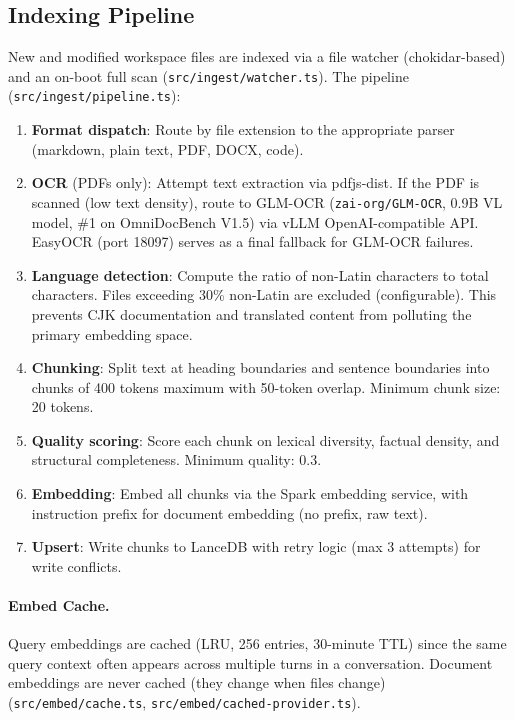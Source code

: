 \documentclass[11pt]{article}
\begin{document}
\subsection{Indexing Pipeline}
\label{sec:arch:ingest}

New and modified workspace files are indexed via a file watcher (chokidar-based) and an
on-boot full scan (\texttt{src/ingest/watcher.ts}). The pipeline
(\texttt{src/ingest/pipeline.ts}):

\begin{enumerate}[leftmargin=2em, itemsep=3pt]
  \item \textbf{Format dispatch}: Route by file extension to the appropriate parser
  (markdown, plain text, PDF, DOCX, code).
  \item \textbf{OCR} (PDFs only): Attempt text extraction via pdfjs-dist. If the PDF
  is scanned (low text density), route to GLM-OCR (\texttt{zai-org/GLM-OCR}, 0.9B VL
  model, \#1 on OmniDocBench V1.5) via vLLM OpenAI-compatible API. EasyOCR (port 18097)
  serves as a final fallback for GLM-OCR failures.
  \item \textbf{Language detection}: Compute the ratio of non-Latin characters to total
  characters. Files exceeding 30\% non-Latin are excluded (configurable). This prevents
  CJK documentation and translated content from polluting the primary embedding space.
  \item \textbf{Chunking}: Split text at heading boundaries and sentence boundaries into
  chunks of 400 tokens maximum with 50-token overlap. Minimum chunk size: 20 tokens.
  \item \textbf{Quality scoring}: Score each chunk on lexical diversity, factual density,
  and structural completeness. Minimum quality: 0.3.
  \item \textbf{Embedding}: Embed all chunks via the Spark embedding service, with
  instruction prefix for document embedding (no prefix, raw text).
  \item \textbf{Upsert}: Write chunks to LanceDB with retry logic (max 3 attempts) for
  write conflicts.
\end{enumerate}

\paragraph{Embed Cache.}
Query embeddings are cached (LRU, 256 entries, 30-minute TTL) since the same query
context often appears across multiple turns in a conversation. Document embeddings are
never cached (they change when files change) (\texttt{src/embed/cache.ts},
\texttt{src/embed/cached-provider.ts}).
\end{document}
